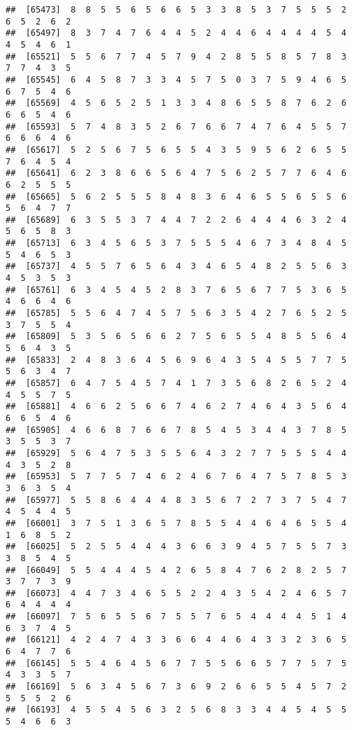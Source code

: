 \documentclass[
]{book}
\begin{document}
\begin{verbatim}
##  [65473]  8  8  5  5  6  5  6  6  5  3  3  8  5  3  7  5  5  5  2  6  5  2  6  2
##  [65497]  8  3  7  4  7  6  4  4  5  2  4  4  6  4  4  4  4  5  4  4  5  4  6  1
##  [65521]  5  5  6  7  7  4  5  7  9  4  2  8  5  5  8  5  7  8  3  7  7  4  3  5
##  [65545]  6  4  5  8  7  3  3  4  5  7  5  0  3  7  5  9  4  6  5  6  7  5  4  6
##  [65569]  4  5  6  5  2  5  1  3  3  4  8  6  5  5  8  7  6  2  6  6  6  5  4  6
##  [65593]  5  7  4  8  3  5  2  6  7  6  6  7  4  7  6  4  5  5  7  6  6  6  4  6
##  [65617]  5  2  5  6  7  5  6  5  5  4  3  5  9  5  6  2  6  5  5  7  6  4  5  4
##  [65641]  6  2  3  8  6  6  5  6  4  7  5  6  2  5  7  7  6  4  6  6  2  5  5  5
##  [65665]  5  6  2  5  5  5  8  4  8  3  6  4  6  5  5  6  5  5  6  5  6  4  7  7
##  [65689]  6  3  5  5  3  7  4  4  7  2  2  6  4  4  4  6  3  2  4  5  6  5  8  3
##  [65713]  6  3  4  5  6  5  3  7  5  5  5  4  6  7  3  4  8  4  5  5  4  6  5  3
##  [65737]  4  5  5  7  6  5  6  4  3  4  6  5  4  8  2  5  5  6  3  4  5  3  5  3
##  [65761]  6  3  4  5  4  5  2  8  3  7  6  5  6  7  7  5  3  6  5  4  6  6  4  6
##  [65785]  5  5  6  4  7  4  5  7  5  6  3  5  4  2  7  6  5  2  5  3  7  5  5  4
##  [65809]  5  3  5  6  5  6  6  2  7  5  6  5  5  4  8  5  5  6  4  5  6  4  3  5
##  [65833]  2  4  8  3  6  4  5  6  9  6  4  3  5  4  5  5  7  7  5  5  6  3  4  7
##  [65857]  6  4  7  5  4  5  7  4  1  7  3  5  6  8  2  6  5  2  4  4  5  5  7  5
##  [65881]  4  6  6  2  5  6  6  7  4  6  2  7  4  6  4  3  5  6  4  6  6  5  4  6
##  [65905]  4  6  6  8  7  6  6  7  8  5  4  5  3  4  4  3  7  8  5  3  5  5  3  7
##  [65929]  5  6  4  7  5  3  5  5  6  4  3  2  7  7  5  5  5  4  4  4  3  5  2  8
##  [65953]  5  7  7  5  7  4  6  2  4  6  7  6  4  7  5  7  8  5  3  3  6  3  5  4
##  [65977]  5  5  8  6  4  4  4  8  3  5  6  7  2  7  3  7  5  4  7  4  5  4  4  5
##  [66001]  3  7  5  1  3  6  5  7  8  5  5  4  4  6  4  6  5  5  4  1  6  8  5  2
##  [66025]  5  2  5  5  4  4  4  3  6  6  3  9  4  5  7  5  5  7  3  3  8  5  4  5
##  [66049]  5  5  4  4  4  5  4  2  6  5  8  4  7  6  2  8  2  5  7  3  7  7  3  9
##  [66073]  4  4  7  3  4  6  5  5  2  2  4  3  5  4  2  4  6  5  7  6  4  4  4  4
##  [66097]  7  5  6  5  5  6  7  5  5  7  6  5  4  4  4  4  5  1  4  6  3  7  4  5
##  [66121]  4  2  4  7  4  3  3  6  6  4  4  6  4  3  3  2  3  6  5  6  4  7  7  6
##  [66145]  5  5  4  6  4  5  6  7  7  5  5  6  6  5  7  7  5  7  5  4  3  3  5  7
##  [66169]  5  6  3  4  5  6  7  3  6  9  2  6  6  5  5  4  5  7  2  5  5  5  2  6
##  [66193]  4  5  5  4  5  6  3  2  5  6  8  3  3  4  4  5  4  5  5  5  4  6  6  3

\end{verbatim}
\end{document}
